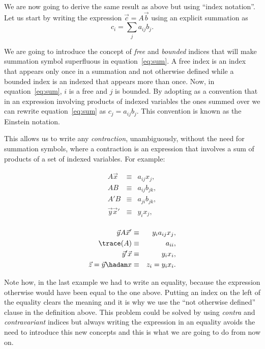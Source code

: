 \documentclass{article}
\begin{document}
We are now going to derive the same result as above but using ``index
notation''. Let us start by writing the expression \(\vec c = A \vec b\) using an
explicit summation as
\begin{equation}
	c_i = \sum_j a_{ij} b_j. \label{eq:sum}
\end{equation}

We are going to introduce the concept of \emph{free} and \emph{bounded} indices
that will make summation symbol superfluous in equation~\ref{eq:sum}. A free
index is an index that appears only once in a summation and not otherwise
defined while a bounded index is an indexed that appears more than once. Now, in
equation~\ref{eq:sum}, \(i\) is a free and \(j\) is bounded. By adopting as a
convention that in an expression involving products of indexed variables the
ones summed over we can rewrite equation~\ref{eq:sum} as \(c_j = a_{ij} b_{j}\).
This convention is known as the Einstein notation.

This allows us to write any \emph{contraction}, unambiguously, without the need
for summation symbols, where a contraction is an expression that involves a sum
of products of a set of indexed variables. For example:

\noindent
\begin{minipage}{.5\textwidth}
\begin{eqnarray*}
A \vec x &\equiv& a_{ij} x_j, \\
A B &\equiv& a_{ij} b_{jk}, \\
A' B &\equiv& a_{ji} b_{jk}, \\
\vec y \vec x' &\equiv& y_i x_j,\\
\end{eqnarray*}
\end{minipage}
\begin{minipage}{.5\textwidth}
\begin{eqnarray*}
\vec y A \vec x' &\equiv& y_i a_{ij} x_j, \\
\trace(A) &\equiv& a_{ii}, \\
\vec y' \vec x &\equiv& y_i x_i, \\
\vec z = \vec y \hadam x &\equiv& z_i = y_i x_i.\\
\end{eqnarray*}
\end{minipage}

Note how, in the last example we had to write an equality, because the
expression otherwise would have been equal to the one above. Putting an index on
the left of the equality clears the meaning and it is why we use
the ``not otherwise defined'' clause in the definition above. This problem could
be solved by using \emph{contra} and \emph{contravariant} indices but always
writing the expression in an equality avoids the need to introduce this new
concepts and this is what we are going to do from now on.
\end{document}
